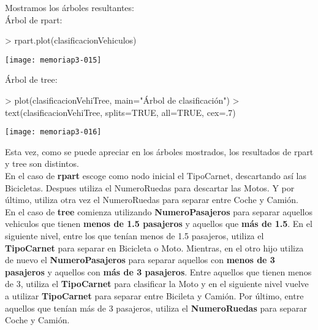 \documentclass [a4paper] {article}
\begin{document}
Mostramos los árboles resultantes:\\
Árbol de rpart:

\begin{Schunk}
\begin{Sinput}
> rpart.plot(clasificacionVehiculos)
\end{Sinput}
\end{Schunk}
\texttt{[image: memoriap3-015]}

Árbol de tree:

\begin{Schunk}
\begin{Sinput}
> plot(clasificacionVehiTree, main="Árbol de clasificación")
> text(clasificacionVehiTree, splits=TRUE, all=TRUE, cex=.7)
\end{Sinput}
\end{Schunk}
\texttt{[image: memoriap3-016]}

Esta vez, como se puede apreciar en los árboles mostrados, los resultados de rpart y tree son distintos.\\
En el caso de \textbf{rpart} escoge como nodo inicial el TipoCarnet, descartando así las Bicicletas. Despues utiliza el NumeroRuedas 
para descartar las Motos. Y por último, utiliza otra vez el NumeroRuedas para separar entre Coche y Camión.\\
En el caso de \textbf{tree} comienza utilizando \textbf{NumeroPasajeros} para separar aquellos vehiculos
que tienen \textbf{menos de 1.5 pasajeros} y aquellos que \textbf{más de 1.5}. En el siguiente nivel, entre los que tenían menos
de 1.5 pasajeros, utiliza el \textbf{TipoCarnet} para separar en Bicicleta o Moto. Mientras, en el otro
hijo utiliza de nuevo el \textbf{NumeroPasajeros} para separar aquellos con \textbf{menos de 3 pasajeros} y aquellos con
\textbf{más de 3 pasajeros}. Entre aquellos que tienen menos de 3, utiliza el \textbf{TipoCarnet} para clasificar 
la Moto y en el siguiente nivel vuelve a utilizar \textbf{TipoCarnet} para separar entre Bicileta y Camión.
Por último, entre aquellos que tenían más de 3 pasajeros, utiliza el \textbf{NumeroRuedas} para separar Coche y Camión.
\end{document}
